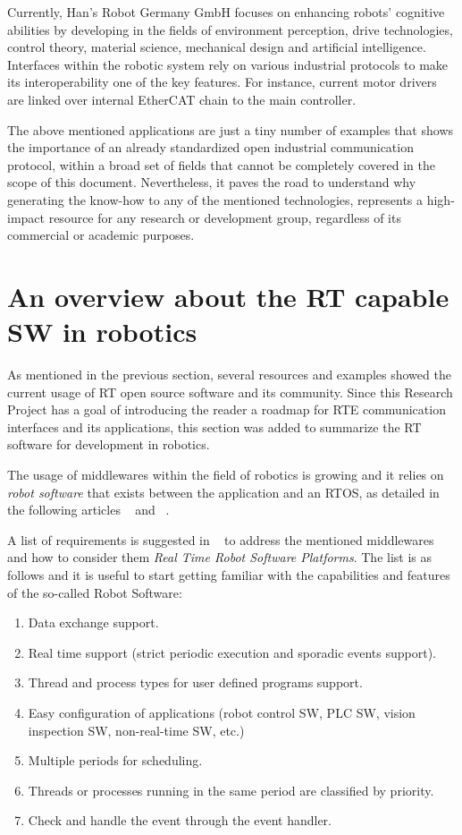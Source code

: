 Currently, Han's Robot Germany GmbH focuses on enhancing robots’ cognitive abilities by developing in the fields of environment perception, 
drive technologies, 
control theory, material science, mechanical design and artificial intelligence. Interfaces within the robotic system rely on various
industrial protocols to make its interoperability one of the key features. For instance, current motor drivers
are linked over internal EtherCAT chain to the main controller.

The above mentioned applications are just a tiny number of examples that shows the importance of an already standardized open industrial communication protocol, 
within a broad set of fields that cannot be completely covered in the scope of this document. Nevertheless, it paves the road to understand why generating the know-how 
to any of the mentioned technologies, represents a high-impact resource for any research or development group, regardless of its commercial or academic purposes.

\section{An overview about the RT capable SW in robotics}

As mentioned in the previous section, several resources and examples showed the current usage of RT
open source software and its community. Since this Research Project has a goal of introducing the reader a 
roadmap for RTE communication interfaces and 
its applications, this section was added to summarize the RT software for development in robotics.

The usage of middlewares within the field of robotics is growing and it relies on \emph{robot software} that 
exists between the application and an RTOS, as detailed in the following articles ~\cite{ecat_xenomai} and ~\cite{ecat_motionplanning}.%

A list of requirements is suggested in ~\cite{middleware_industrial} %
to address the mentioned middlewares and how to consider them \emph{Real Time Robot Software Platforms}.  
The list is as follows and it is useful to start getting familiar with the capabilities 
and features of the so-called Robot Software: 
\begin{enumerate}
    \item Data exchange support.
    \item Real time support (strict periodic execution and sporadic events support).
    \item Thread and process types for user defined programs support.
    \item Easy configuration of applications (robot control SW, PLC SW, vision inspection SW, non-real-time SW, etc.)
    \item Multiple periods for scheduling.
    \item Threads or processes running in the same period are classified by priority.
    \item Check and handle the event through the event handler.
\end{enumerate}

